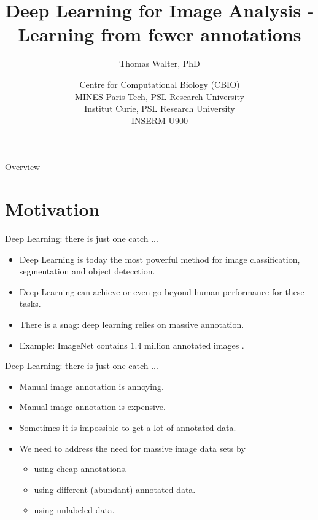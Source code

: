\documentclass[xcolor=pdftex,dvipsnames,table]{beamer}
\title{Deep Learning for Image Analysis - \\
	   Learning from fewer annotations}
\author{Thomas Walter, PhD}
\date{Centre for Computational Biology (CBIO) \\
	  MINES Paris-Tech, PSL Research University \\
	  Institut Curie, PSL Research University \\
	  INSERM U900}
\begin{document}
\begin{frame}
\titlepage
\end{frame}

\begin{frame}{Overview}
\tableofcontents
\end{frame}

\section{Motivation}

\begin{frame}{Deep Learning: there is just one catch ... }
\begin{itemize}
	\item Deep Learning is today the most powerful method for image classification, segmentation and object detecction. 
   \item Deep Learning can achieve or even go beyond human performance for these tasks. 
   \item There is a snag: deep learning relies on massive annotation.
   \item Example: ImageNet contains $1.4$ million annotated images \cite{ImageNet:2015}. 
\end{itemize}
\end{frame}

\begin{frame}{Deep Learning: there is just one catch ... }
\begin{itemize}
\item Manual image annotation is annoying.
\item Manual image annotation is expensive.
\item Sometimes it is impossible to get a lot of annotated data.
\item We need to address the need for massive image data sets by
\begin{itemize}
   \item using cheap annotations.
   \item using different (abundant) annotated data.
   \item using unlabeled data.
\end{itemize}
\end{itemize}
\end{frame}
\end{document}
